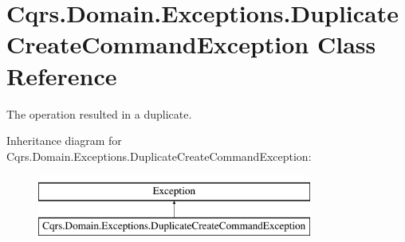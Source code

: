 \hypertarget{classCqrs_1_1Domain_1_1Exceptions_1_1DuplicateCreateCommandException}{}\section{Cqrs.\+Domain.\+Exceptions.\+Duplicate\+Create\+Command\+Exception Class Reference}
\label{classCqrs_1_1Domain_1_1Exceptions_1_1DuplicateCreateCommandException}


The operation resulted in a duplicate.  


Inheritance diagram for Cqrs.\+Domain.\+Exceptions.\+Duplicate\+Create\+Command\+Exception\+:\begin{figure}[H]
\begin{center}
\leavevmode
\includegraphics[height=2.000000cm]{classCqrs_1_1Domain_1_1Exceptions_1_1DuplicateCreateCommandException}
\end{center}
\end{figure}
